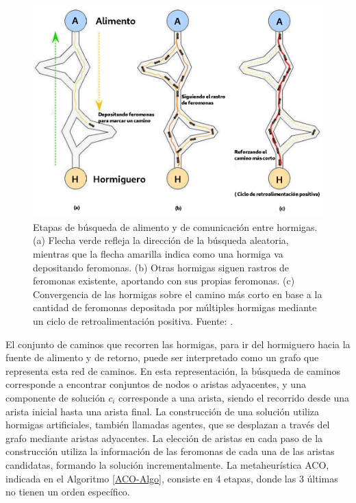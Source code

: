 \begin{figure}[h]
    \centering
    \includegraphics[scale=0.5]{imagenes/ACO-ant.png}
    \caption{Etapas de b\'usqueda de alimento y de comunicaci\'on entre hormigas. (a) Flecha verde refleja la direcci\'on de la  b\'usqueda aleatoria, mientras que la flecha amarilla indica como una hormiga va depositando feromonas. (b) Otras hormigas siguen rastros de feromonas existente, aportando con sus propias feromonas. (c) Convergencia de las hormigas sobre el camino m\'as corto en base a la cantidad de feromonas depositada por m\'ultiples hormigas mediante un ciclo de retroalimentaci\'on positiva. Fuente: \cite{liu2020improving}.}
    \label{fig:hormigas}
\end{figure}

El conjunto de caminos que recorren las hormigas, para ir del hormiguero hacia la fuente de alimento y de retorno, puede ser interpretado como un grafo que representa esta red de caminos. En esta representaci\'on, la b\'usqueda de caminos corresponde a encontrar conjuntos de nodos o aristas adyacentes, y una componente de soluci\'on $c_{i}$ corresponde a una arista, siendo el recorrido desde una arista inicial hasta una arista final. La construcci\'on de una soluci\'on utiliza hormigas artificiales, tambi\'en llamadas agentes, que se desplazan a trav\'es del grafo mediante aristas adyacentes. La elecci\'on de aristas en cada paso de la construcci\'on utiliza la informaci\'on de las feromonas de cada una de las aristas candidatas, formando la soluci\'on incrementalmente. La metaheur\'istica ACO, indicada en el Algoritmo \ref{ACO-Algo}, consiste en 4 etapas, donde las 3 \'ultimas no tienen un orden espec\'ifico.

